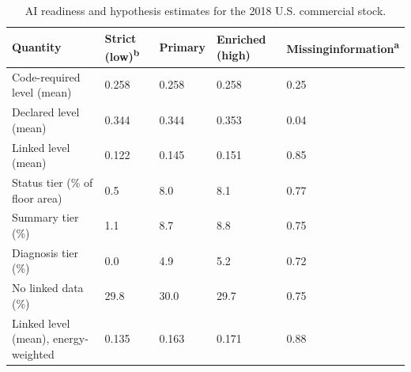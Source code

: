 \begin{table}[!htbp]
\centering
\footnotesize\linespread{1}\selectfont
\caption{AI readiness and hypothesis estimates for the 2018 U.S. commercial stock.}
\label{tab:table_headline}
\setlength{\tabcolsep}{4pt}
\begin{tabular}{L{3.6cm}L{2.0cm}L{2.1cm}L{2.0cm}L{2.0cm}}
\toprule
Quantity & Strict (low)\textsuperscript{b} & Primary & Enriched (high) & Missing\newline information\textsuperscript{a} \\
\midrule
Code-required level (mean) & 0.258\newline [0.255, 0.261] & 0.258\newline [0.255, 0.261] & 0.258\newline [0.255, 0.261] & 0.25 \\
Declared level (mean) & 0.344\newline [0.337, 0.351] & 0.344\newline [0.337, 0.351] & 0.353\newline [0.346, 0.360] & 0.04 \\
Linked level (mean) & 0.122\newline [0.109, 0.135] & 0.145\newline [0.127, 0.163] & 0.151\newline [0.131, 0.171] & 0.85 \\
Status tier (\% of floor area) & 0.5\newline [0.3, 1.1] & 8.0\newline [5.9, 10.6] & 8.1\newline [6.0, 11.0] & 0.77 \\
Summary tier (\%) & 1.1\newline [0.6, 1.9] & 8.7\newline [6.6, 11.3] & 8.8\newline [6.7, 11.6] & 0.75 \\
Diagnosis tier (\%) & 0.0\newline [0.0, 0.0] & 4.9\newline [3.6, 6.8] & 5.2\newline [3.8, 7.2] & 0.72 \\
No linked data (\%) & 29.8\newline [26.0, 33.9] & 30.0\newline [26.4, 34.0] & 29.7\newline [25.9, 33.8] & 0.75 \\
Linked level (mean), energy-weighted & 0.135\newline [0.118, 0.151] & 0.163\newline [0.141, 0.185] & 0.171\newline [0.146, 0.196] & 0.88 \\

\end{tabular}
\end{table}
